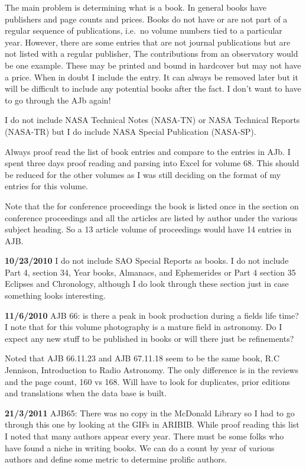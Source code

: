 The main problem is determining what is a book. In general books have
publishers and page counts and prices.  Books do not have or are not
part of a regular sequence of publications, i.e.\ no volume numbers
tied to a particular year.  However, there are some entries that are
not journal publications but are not listed with a regular publisher,
The contributions from an observatory would be one example.  These may
be printed and bound in hardcover but may not have a price.  When in
doubt I include the entry.  It can always be removed later but it will
be difficult to include any potential books after the fact. I don't
want to have to go through the AJb again!

I do not include NASA Technical Notes (NASA-TN) or NASA Technical
Reports (NASA-TR) but I do include NASA Special Publication (NASA-SP).

Always proof read the list of book entries and compare to the entries
in AJb. I spent three days proof reading and parsing into Excel for
volume 68. This should be reduced for the other volumes as I was still
deciding on the format of my entries for this volume.

Note that the for conference proceedings the book is listed once in
the section on conference proceedings and all the articles are listed
by author under the various subject heading. So a 13 article volume of
proceedings would have 14 entries in AJB.

{\bf 10/23/2010}
I do not include SAO Special Reports as books. I do not include Part
4, section 34, Year books, Almanacs, and Ephemerides or Part 4 section
35 Eclipses and Chronology, although I do look through these section
just in case something looks interesting.

{\bf 11/6/2010}
AJB 66: is there a peak in book production during a
fields life time?  I note that for this volume photography is a mature
field in astronomy.  Do I expect any new stuff to be published in
books or will there just be refinements?

Noted that AJB 66.11.23 and AJB 67.11.18 seem to be the same book, R.C
Jennison, Introduction to Radio Astronomy. The only difference is in
the reviews and the page count, 160 vs 168.  Will have to look for
duplicates, prior editions and translations when the data base is built.


{\bf 21/3/2011}
AJB65: There was no copy in the McDonald Library so I had to go through
this one by looking at the GIFs in ARIBIB.  While proof reading this list
I noted that many authors appear every year.  There must be some folks
who have found a niche in writing books.  We can do a count by year of
various authors and define some metric to determine prolific authors.


